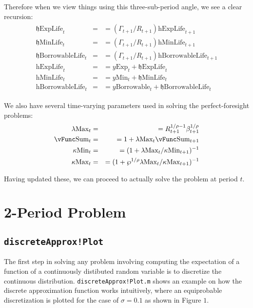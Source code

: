 \documentclass[titlepage,abstract]{\econtex}
\providecommand{\lambdaMax}{\lambda\text{Max}}
\providecommand{\kappaMax}{\kappa\text{Max}}
\providecommand{\kappaMin}{\kappa\text{Min}}
\providecommand{\vSum}{\vFunc\text{Sum}}
\providecommand{\pUnem}{\wp}
\providecommand{\hExpLife}{\mathrm{h}\text{ExpLife}}
\providecommand{\hMinLife}{\mathrm{h}\text{MinLife}}
\providecommand{\hBorrowableLife}{\mathrm{h}\text{BorrowableLife}}
\providecommand{\hEndExpLife}{\mathfrak{h}\text{ExpLife}}
\providecommand{\hEndMinLife}{\mathfrak{h}\text{MinLife}}
\providecommand{\hEndBorrowableLife}{\mathfrak{h}\text{BorrowableLife}}
\providecommand{\yMin}{y\text{Min}}
\providecommand{\yBorrowable}{y\text{Borrowable}}
\providecommand{\yExp}{y\text{Exp}}
\begin{document}
Therefore when we view things using this three-sub-period angle, we see a clear recursion:
\begin{equation}\begin{gathered}\begin{aligned}
          \hEndExpLife_{t}  &=& =  (\Gamma_{t+1}/R_{t+1}) \hExpLife_{t+1} \\
          \hEndMinLife_{t}  &=& =  (\Gamma_{t+1}/R_{t+1}) \hMinLife_{t+1} \\
          \hEndBorrowableLife_{t}  &=& =  (\Gamma_{t+1}/R_{t+1}) \hBorrowableLife_{t+1} \\
          \hExpLife_{t}  &=& =  \yExp_{t} +\hEndExpLife_{t} \\
          \hMinLife_{t}  &=& =  \yMin_{t} +\hEndMinLife_{t} \\
          \hBorrowableLife_{t}  &=& =  \yBorrowable_{t} +\hEndBorrowableLife_{t}
\end{aligned}\end{gathered}\end{equation}

We also have several time-varying parameters used in solving the perfect-foresight problems:
          \begin{equation}\begin{gathered}\begin{aligned}
          \lambdaMax_{t}  &=& =  R_{t+1}^{1/\rho-1}\beta_{t+1}^{1/\rho} \\
          \vSum_{t}  &=& =  1+ \lambdaMax_{t} \vSum_{t+1} \\
          \kappaMin_{t}  &=& =  (1+\lambdaMax_{t}/\kappaMin_{t+1})^{-1} \\
          \kappaMax_{t}  &=& =  (1+\pUnem^{1/\rho}\lambdaMax_{t}/\kappaMax_{t+1})^{-1}
          \end{aligned}\end{gathered}\end{equation}

Having updated these, we can proceed to actually solve the problem at period $t$.
          
\section{2-Period Problem}
\subsection{\texttt{discreteApprox!Plot}}
The first step in solving any problem involving computing the expectation of a function of a continuously distibuted random variable is to discretize the continuous distribution. \texttt{discreteApprox!Plot.m} shows an example on how the discrete approximation function works intuitively, where an equiprobable discretization is plotted for the case of $\sigma= 0.1$ as shown in Figure $1$.
\end{document}
